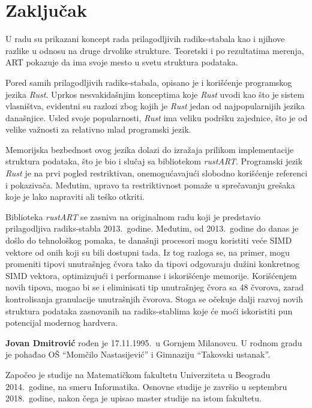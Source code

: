 \documentclass[12pt,oneside]{memoir}
\begin{document}
\chapter{Zaključak}
U radu su prikazani koncept rada prilagodljivih radiks-stabala
kao i njihove razlike u odnosu na druge drvolike strukture.
Teoretski i po rezultatima merenja, ART pokazuje da
ima svoje mesto u svetu struktura podataka.

Pored samih prilagodljivih radiks-stabala, opisano je i korišćenje
programskog jezika \textit{Rust}. Uprkos nesvakidašnjim konceptima
koje \textit{Rust} uvodi kao što je sistem vlasništva,
evidentni su razlozi zbog kojih je \textit{Rust} jedan od najpopularnijih
jezika današnjice. Usled svoje popularnosti, \textit{Rust}
ima veliku podršku zajednice, što je od velike važnosti za
relativno mlad programski jezik.

Memorijska bezbednost ovog jezika dolazi do izražaja
prilikom implementacije struktura podataka, što je bio i slučaj sa
bibliotekom \textit{rustART}. Programski jezik \textit{Rust} je
na prvi pogled restriktivan, onemogućavajući slobodno korišćenje
referenci i pokazivača. Međutim, upravo ta restriktivnost
pomaže u sprečavanju grešaka koje je lako napraviti ali
teško otkriti.

Biblioteka \textit{rustART} se zasniva na originalnom radu koji je
predstavio prilagodljiva radiks-stabla 2013.\ godine. Međutim,
od 2013.\ godine do danas je došlo do tehnološkog pomaka,
te današnji procesori mogu koristiti veće SIMD vektore od onih koji
su bili dostupni tada. Iz tog razloga se, na primer, mogu
promeniti tipovi unutrašnjeg čvora tako da tipovi odgovaraju
dužini konkretnog SIMD vektora, optimizujući i performanse
i iskorišćenje memorije.
Korišćenjem novih tipova, mogao bi se i eliminisati tip unutrašnjeg
čvora sa 48 čvorova, zarad kontrolisanja granulacije unutrašnjih čvorova.
Stoga se očekuje dalji razvoj
novih struktura podataka zasnovanih na radiks-stablima
koje će moći iskoristiti pun potencijal modernog hardvera.

\literatura

\backmatter

\begin{biografija}
  \textbf{Jovan Dmitrović} rođen je 17.11.1995.\ u Gornjem Milanovcu.
  U rodnom gradu je pohađao OŠ ``Momčilo Nastasijević'' i Gimnaziju
  ``Takovski ustanak''.

  Započeo je studije na Matematičkom fakultetu Univerziteta u Beogradu
  2014.\ godine, na smeru Informatika. Osnovne studije je završio
  u septembru 2018.\ godine, nakon čega je upisao master studije
  na istom fakultetu.
\end{biografija}
\end{document}
